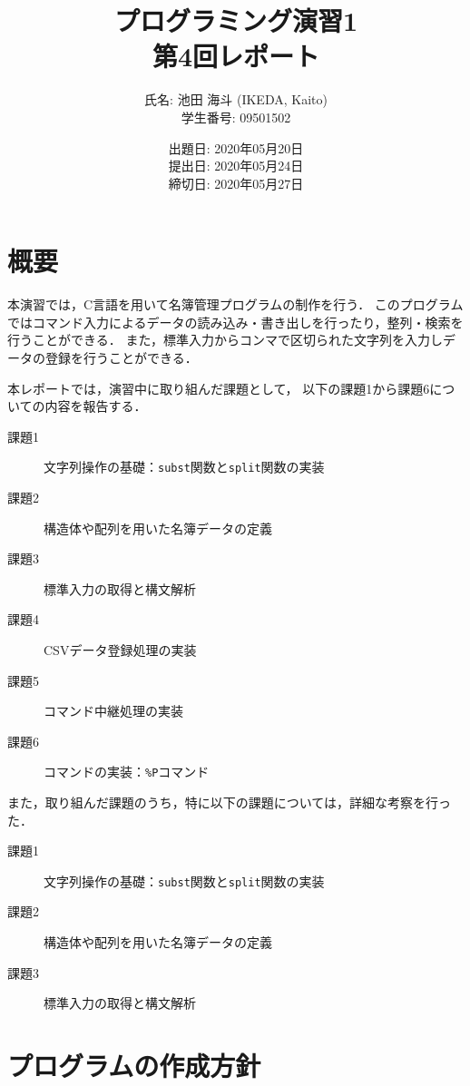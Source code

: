 \documentclass[autodetect-engine,dvi=dvipdfmx,ja=standard,
               a4j,11pt]{bxjsarticle}
\title{プログラミング演習1 \\
       第4回レポート}
\author{氏名: 池田 海斗 (IKEDA, Kaito) \\
        学生番号: 09501502}
\date{出題日: 2020年05月20日 \\
      提出日: 2020年05月24日 \\
      締切日: 2020年05月27日 \\}
\begin{document}
\maketitle

\section{概要} \label{sec:1}

本演習では，C言語を用いて名簿管理プログラムの制作を行う．
このプログラムではコマンド入力によるデータの読み込み・書き出しを行ったり，整列・検索を行うことができる．
また，標準入力からコンマで区切られた文字列を入力しデータの登録を行うことができる．

本レポートでは，演習中に取り組んだ課題として，
以下の課題1から課題6についての内容を報告する．

\begin{description}
  \item[課題1] 文字列操作の基礎：\verb|subst|関数と\verb|split|関数の実装
  \item[課題2] 構造体や配列を用いた名簿データの定義
  \item[課題3] 標準入力の取得と構文解析
  \item[課題4] CSVデータ登録処理の実装
  \item[課題5] コマンド中継処理の実装
  \item[課題6] コマンドの実装：\verb|%P|コマンド
\end{description}

また，取り組んだ課題のうち，特に以下の課題については，詳細な考察を行った．

\begin{description}
  \item[課題1] 文字列操作の基礎：\verb|subst|関数と\verb|split|関数の実装
  \item[課題2] 構造体や配列を用いた名簿データの定義
  \item[課題3] 標準入力の取得と構文解析
\end{description}


\section{プログラムの作成方針} \label{sec:2}
\end{document}

